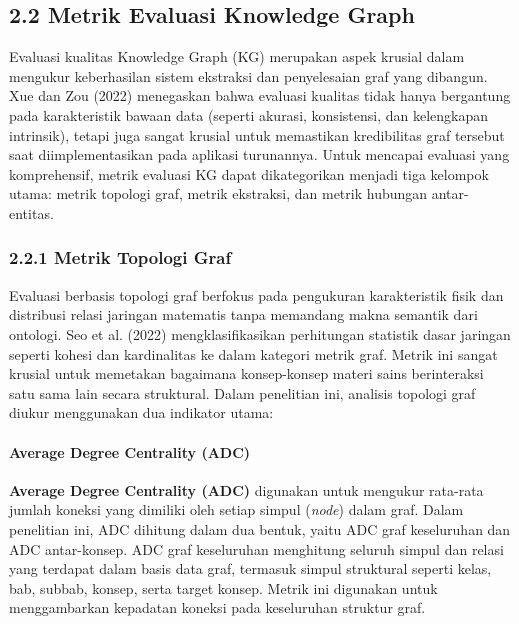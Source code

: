 \documentclass[
]{article}
\begin{document}
\hypertarget{metrik-evaluasi-knowledge-graph}{%
\subsection{2.2 Metrik Evaluasi Knowledge
Graph}\label{metrik-evaluasi-knowledge-graph}}

Evaluasi kualitas Knowledge Graph (KG) merupakan aspek krusial dalam
mengukur keberhasilan sistem ekstraksi dan penyelesaian graf yang
dibangun. Xue dan Zou (2022) menegaskan bahwa evaluasi kualitas tidak
hanya bergantung pada karakteristik bawaan data (seperti akurasi,
konsistensi, dan kelengkapan intrinsik), tetapi juga sangat krusial
untuk memastikan kredibilitas graf tersebut saat diimplementasikan pada
aplikasi turunannya\emph{.} Untuk mencapai evaluasi yang komprehensif,
metrik evaluasi KG dapat dikategorikan menjadi tiga kelompok utama:
metrik topologi graf, metrik ekstraksi, dan metrik hubungan
antar-entitas.

\hypertarget{metrik-topologi-graf}{%
\subsubsection{2.2.1 Metrik Topologi Graf}\label{metrik-topologi-graf}}

Evaluasi berbasis topologi graf berfokus pada pengukuran karakteristik
fisik dan distribusi relasi jaringan matematis tanpa memandang makna
semantik dari ontologi. Seo et al. (2022) mengklasifikasikan perhitungan
statistik dasar jaringan seperti kohesi dan kardinalitas ke dalam
kategori metrik graf. Metrik ini sangat krusial untuk memetakan
bagaimana konsep-konsep materi sains berinteraksi satu sama lain secara
struktural. Dalam penelitian ini, analisis topologi graf diukur
menggunakan dua indikator utama:

\hypertarget{average-degree-centrality-adc}{%
\paragraph{Average Degree Centrality
(ADC)}\label{average-degree-centrality-adc}}

\textbf{Average Degree Centrality (ADC)} digunakan untuk mengukur
rata-rata jumlah koneksi yang dimiliki oleh setiap simpul (\emph{node})
dalam graf. Dalam penelitian ini, ADC dihitung dalam dua bentuk, yaitu
ADC graf keseluruhan dan ADC antar-konsep. ADC graf keseluruhan
menghitung seluruh simpul dan relasi yang terdapat dalam basis data
graf, termasuk simpul struktural seperti kelas, bab, subbab, konsep,
serta target konsep. Metrik ini digunakan untuk menggambarkan kepadatan
koneksi pada keseluruhan struktur graf.
\end{document}
